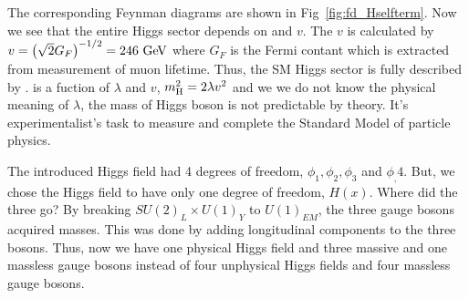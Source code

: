 The corresponding Feynman diagrams are shown in Fig~\ref{fig:fd_Hselfterm}. 
Now we see that the entire Higgs sector depends on \mHi and $v$.
The $v$ is calculated by $v = \left( \sqrt{2} G_F \right)^{-1/2} = 246~\mathrm{Ge\kern -0.1em V}$  
where $G_F$ is the Fermi contant which is extracted from measurement 
of muon lifetime. 
Thus, the SM Higgs sector is fully described by \mHi. 
\mHi is a fuction of $\lambda$ and $v$,  $m_{\mathrm{H}}^2 = 2 \lambda v^2$
and we we do not know the physical meaning of $\lambda$, 
the mass of Higgs boson is not predictable by theory.
It's experimentalist's task to measure \mHi{} and 
complete the Standard Model of particle physics.

The introduced Higgs field had 4 degrees of freedom, $\phi_1, \phi_2, \phi_3$ 
and $\phi_,4$. But, we chose the Higgs field to have only one degree of freedom, $H(x)$.  
Where did the three go? 
By breaking $SU(2)_L \times U(1)_Y$ to $U(1)_{EM}$, the three gauge 
bosons acquired masses. This was done by adding longitudinal components 
to the three bosons. Thus, now we have one physical Higgs field and 
three massive and one massless gauge bosons instead of four unphysical 
Higgs fields and four massless gauge bosons.

